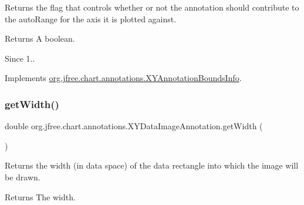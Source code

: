 Returns the flag that controls whether or not the annotation should contribute to the auto\+Range for the axis it is plotted against.

\begin{DoxyReturn}{Returns}
A boolean.
\end{DoxyReturn}
\begin{DoxySince}{Since}
1.. 
\end{DoxySince}


Implements \mbox{\hyperlink{interfaceorg_1_1jfree_1_1chart_1_1annotations_1_1_x_y_annotation_bounds_info_adc1990dadc650880c4c3255c94fcb844}{org.\+jfree.\+chart.\+annotations.\+X\+Y\+Annotation\+Bounds\+Info}}.

\mbox{\label{classorg_1_1jfree_1_1chart_1_1annotations_1_1_x_y_data_image_annotation_a5209c1e637749c8355876694d2519400}} 
\subsubsection{\texorpdfstring{get\+Width()}{getWidth()}}
{\footnotesize\ttfamily double org.\+jfree.\+chart.\+annotations.\+X\+Y\+Data\+Image\+Annotation.\+get\+Width (\begin{DoxyParamCaption}{ }\end{DoxyParamCaption})}

Returns the width (in data space) of the data rectangle into which the image will be drawn.

\begin{DoxyReturn}{Returns}
The width. 
\end{DoxyReturn}
\mbox{\label{classorg_1_1jfree_1_1chart_1_1annotations_1_1_x_y_data_image_annotation_ace8225efc756122845071779d300f887}} 
